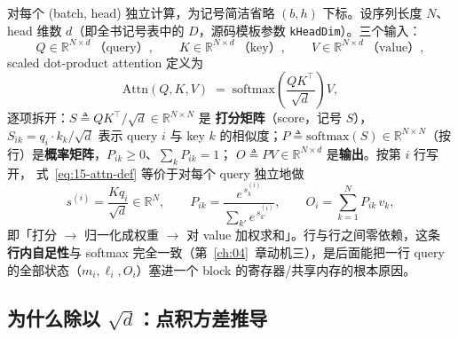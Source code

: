 对每个 (batch, head) 独立计算，为记号简洁省略 $(b,h)$ 下标。设序列长度 $N$、head
维数 $d$（即全书记号表中的 $D$，源码模板参数 \texttt{kHeadDim}）。三个输入：
\begin{equation}
  Q \in \mathbb{R}^{N \times d}\ \text{（query）}, \qquad
  K \in \mathbb{R}^{N \times d}\ \text{（key）}, \qquad
  V \in \mathbb{R}^{N \times d}\ \text{（value）},
\end{equation}
scaled dot-product attention 定义为
\begin{equation}
  \mathrm{Attn}(Q,K,V) \;=\; \mathrm{softmax}\!\left(\frac{QK^{\top}}{\sqrt{d}}\right) V ,
  \label{eq:15-attn-def}
\end{equation}
逐项拆开：$S \triangleq QK^{\top}/\sqrt{d} \in \mathbb{R}^{N \times N}$ 是
\textbf{打分矩阵}（score，记号 $S$），$S_{ik} = q_i \cdot k_k / \sqrt{d}$ 表示
query $i$ 与 key $k$ 的相似度；$P \triangleq \mathrm{softmax}(S) \in \mathbb{R}^{N
\times N}$（按行）是\textbf{概率矩阵}，$P_{ik} \ge 0$、$\sum_{k} P_{ik} = 1$；
$O \triangleq PV \in \mathbb{R}^{N \times d}$ 是\textbf{输出}。按第 $i$ 行写开，
式~\ref{eq:15-attn-def} 等价于对每个 query 独立地做
\begin{equation}
  s^{(i)} = \frac{K q_i}{\sqrt{d}} \in \mathbb{R}^{N},
  \qquad
  P_{ik} = \frac{e^{\,s^{(i)}_k}}{\sum_{k'} e^{\,s^{(i)}_{k'}}},
  \qquad
  O_i = \sum_{k=1}^{N} P_{ik}\, v_k ,
  \label{eq:15-attn-rows}
\end{equation}
即「打分 $\to$ 归一化成权重 $\to$ 对 value 加权求和」。行与行之间零依赖，这条
\textbf{行内自足性}与 softmax 完全一致（第~\ref{ch:04}~章动机三），是后面能把一行
query 的全部状态（$m_i, \ell_i, O_i$）塞进一个 block 的寄存器/共享内存的根本原因。

\subsection{为什么除以 $\sqrt{d}$：点积方差推导}

